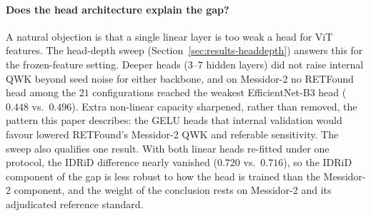 \documentclass[11pt,a4paper]{article}
\begin{document}
\paragraph{Does the head architecture explain the gap?} A natural objection is that a single linear layer is too weak a head for ViT features. The head-depth sweep (Section~\ref{sec:results-headdepth}) answers this for the frozen-feature setting. Deeper heads ($3$--$7$ hidden layers) did not raise internal QWK beyond seed noise for either backbone, and on Messidor-2 no RETFound head among the $21$ configurations reached the weakest EfficientNet-B3 head ($0.448$ vs.\ $0.496$). Extra non-linear capacity sharpened, rather than removed, the pattern this paper describes: the GELU heads that internal validation would favour lowered RETFound's Messidor-2 QWK and referable sensitivity. The sweep also qualifies one result. With both linear heads re-fitted under one protocol, the IDRiD difference nearly vanished ($0.720$ vs.\ $0.716$), so the IDRiD component of the gap is less robust to how the head is trained than the Messidor-2 component, and the weight of the conclusion rests on Messidor-2 and its adjudicated reference standard.
\end{document}
